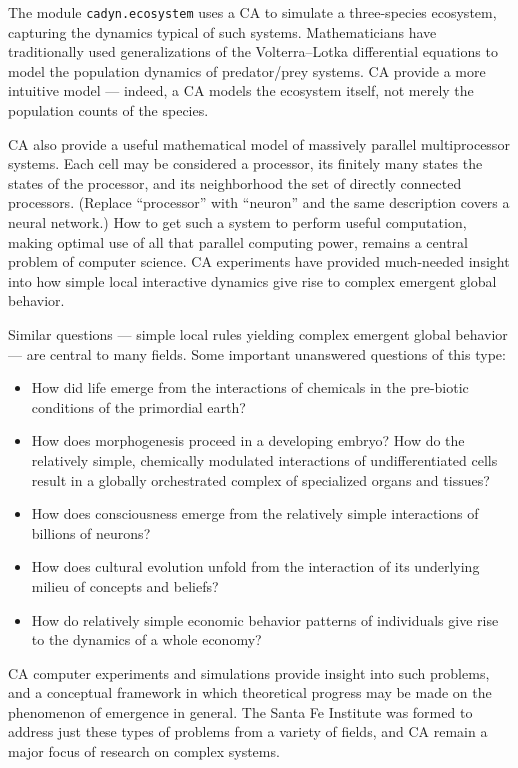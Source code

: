 The module \texttt{cadyn.ecosystem} uses a CA to simulate a
three-species ecosystem, capturing the dynamics typical of such
systems.  Mathematicians have traditionally used generalizations of the
Volterra--Lotka differential equations to model the population dynamics
of predator/prey systems.  CA provide a more intuitive model ---
indeed, a CA models the ecosystem itself, not merely the population
counts of the species.

CA also provide a useful mathematical model of massively parallel
multiprocessor systems.  Each cell may be considered a processor, its
finitely many states the states of the processor, and its neighborhood
the set of directly connected processors.  (Replace ``processor'' with
``neuron'' and the same description covers a neural network.)  How to
get such a system to perform useful computation, making optimal use of
all that parallel computing power, remains a central problem of
computer science.  CA experiments have provided much-needed insight
into how simple local interactive dynamics give rise to complex
emergent global behavior.

Similar questions --- simple local rules yielding complex emergent
global behavior --- are central to many fields.  Some important
unanswered questions of this type:

\begin{itemize}
\item How did life emerge from the interactions of chemicals in the
  pre-biotic conditions of the primordial earth?
\item How does morphogenesis proceed in a developing embryo?  How do
  the relatively simple, chemically modulated interactions of
  undifferentiated cells result in a globally orchestrated complex of
  specialized organs and tissues?
\item How does consciousness emerge from the relatively simple
  interactions of billions of neurons?
\item How does cultural evolution unfold from the interaction of its
  underlying milieu of concepts and beliefs?
\item How do relatively simple economic behavior patterns of
  individuals give rise to the dynamics of a whole economy?
\end{itemize}

CA computer experiments and simulations provide insight into such
problems, and a conceptual framework in which theoretical progress may
be made on the phenomenon of emergence in general.  The Santa Fe
Institute was formed to address just these types of problems from a
variety of fields, and CA remain a major focus of research on complex
systems.

